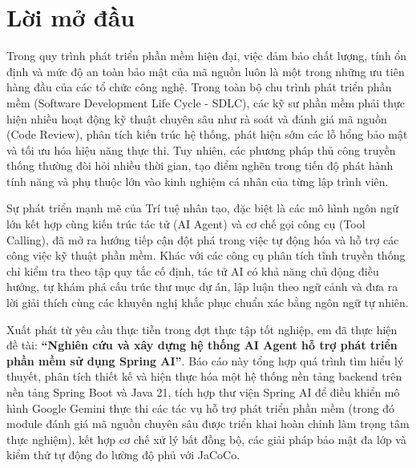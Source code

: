 \documentclass[12pt,a4paper]{report}
\begin{document}

\chapter*{Lời mở đầu}

Trong quy trình phát triển phần mềm hiện đại, việc đảm bảo chất lượng, tính ổn định và mức độ an toàn bảo mật của mã nguồn luôn là một trong những ưu tiên hàng đầu của các tổ chức công nghệ. Trong toàn bộ chu trình phát triển phần mềm (Software Development Life Cycle - SDLC), các kỹ sư phần mềm phải thực hiện nhiều hoạt động kỹ thuật chuyên sâu như rà soát và đánh giá mã nguồn (Code Review), phân tích kiến trúc hệ thống, phát hiện sớm các lỗ hổng bảo mật và tối ưu hóa hiệu năng thực thi. Tuy nhiên, các phương pháp thủ công truyền thống thường đòi hỏi nhiều thời gian, tạo điểm nghẽn trong tiến độ phát hành tính năng và phụ thuộc lớn vào kinh nghiệm cá nhân của từng lập trình viên.

Sự phát triển mạnh mẽ của Trí tuệ nhân tạo, đặc biệt là các mô hình ngôn ngữ lớn kết hợp cùng kiến trúc tác tử (AI Agent) và cơ chế gọi công cụ (Tool Calling), đã mở ra hướng tiếp cận đột phá trong việc tự động hóa và hỗ trợ các công việc kỹ thuật phần mềm. Khác với các công cụ phân tích tĩnh truyền thống chỉ kiểm tra theo tập quy tắc cố định, tác tử AI có khả năng chủ động điều hướng, tự khám phá cấu trúc thư mục dự án, lập luận theo ngữ cảnh và đưa ra lời giải thích cùng các khuyến nghị khắc phục chuẩn xác bằng ngôn ngữ tự nhiên.

Xuất phát từ yêu cầu thực tiễn trong đợt thực tập tốt nghiệp, em đã thực hiện đề tài: \textbf{``Nghiên cứu và xây dựng hệ thống AI Agent hỗ trợ phát triển phần mềm sử dụng Spring AI''}. Báo cáo này tổng hợp quá trình tìm hiểu lý thuyết, phân tích thiết kế và hiện thực hóa một hệ thống nền tảng backend trên nền tảng Spring Boot và Java 21, tích hợp thư viện Spring AI để điều khiển mô hình Google Gemini thực thi các tác vụ hỗ trợ phát triển phần mềm (trong đó module đánh giá mã nguồn chuyên sâu được triển khai hoàn chỉnh làm trọng tâm thực nghiệm), kết hợp cơ chế xử lý bất đồng bộ, các giải pháp bảo mật đa lớp và kiểm thử tự động đo lường độ phủ với JaCoCo.
\end{document}
